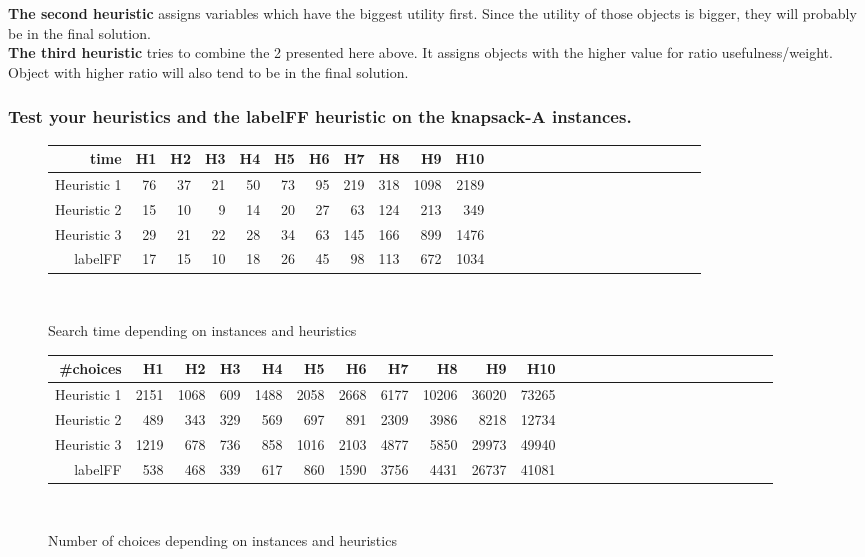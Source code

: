 \documentclass[a4paper ,12pt,french]{article}
\begin{document}
\textbf{The second heuristic} assigns variables which have the biggest utility first. Since the utility of those objects is bigger, they will probably be in the final solution.\\

\textbf{The third heuristic} tries to combine the 2 presented here above. It assigns objects with the higher value for ratio usefulness/weight. Object with higher ratio will also tend to be in the final solution.\\

\subsubsection{Test your heuristics and the labelFF heuristic on the knapsack-A instances.}

\begin{figure}[!h]
\begin{tabular}{|r||r|r|r|r|r|r|r|r|r|r|r|r|r|r|r|r|r|r|r|r|r|r|r|r|r|}
\hline
time&H1&H2&H3&H4&H5&H6&H7&H8&H9&H10\\
\hline
\hline
Heuristic 1&76&37&21&50&73&95&219&318&1098&2189\\
\hline
Heuristic 2&15&10&9&14&20&27&63&124&213&349\\
\hline
Heuristic 3&29&21&22&28&34&63&145&166&899&1476\\
\hline
labelFF&17&15&10&18&26&45&98&113&672&1034\\
\hline
\end{tabular}\\
\caption{Search time depending on instances and heuristics}
\end{figure}


\begin{figure}[!h]
\begin{tabular}{|r||r|r|r|r|r|r|r|r|r|r|r|r|r|r|r|r|r|r|r|r|r|r|r|r|r|}
\hline
\#choices&H1&H2&H3&H4&H5&H6&H7&H8&H9&H10\\
\hline
\hline
Heuristic 1&2151&1068&609&1488&2058&2668&6177&10206&36020&73265\\
\hline
Heuristic 2&489&343&329&569&697&891&2309&3986&8218&12734\\
\hline
Heuristic 3&1219&678&736&858&1016&2103&4877&5850&29973&49940\\
\hline
labelFF&538&468&339&617&860&1590&3756&4431&26737&41081\\
\hline

\end{tabular}\\
\caption{Number of choices depending on instances and heuristics}
\end{figure}
\end{document}
